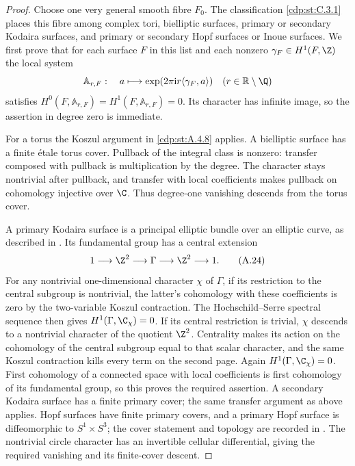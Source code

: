\begin{proof}
Choose one very general smooth fibre $F_0$. The classification \ref{cdp:st:C.3.1} places this fibre among complex tori, bielliptic surfaces, primary or secondary Kodaira surfaces, and primary or secondary Hopf surfaces or Inoue surfaces. We first prove that for each surface $F$ in this list and each nonzero $\gamma_F\in H^1(F,\Z)$ the local system
\[
 \mathbb A_{r,F}:\quad a\longmapsto
       \exp(2\pi\mathrm i r\langle\gamma_F,a\rangle)
 \quad(r\in\mathbb R\setminus\Q)
\]
satisfies $H^0(F,\mathbb A_{r,F})=H^1(F,\mathbb A_{r,F})=0$. Its character has infinite image, so the assertion in degree zero is immediate.

For a torus the Koszul argument in \ref{cdp:st:A.4.8} applies. A bielliptic surface has a finite étale torus cover. Pullback of the integral class is nonzero: transfer composed with pullback is multiplication by the degree. The character stays nontrivial after pullback, and transfer with local coefficients makes pullback on cohomology injective over $\C$. Thus degree-one vanishing descends from the torus cover.

A primary Kodaira surface is a principal elliptic bundle over an elliptic curve, as described in \cite[\S1 and the central-extension diagram in the proof of Lemma~1.1]{SS2002}. Its fundamental group has a central extension
\[
 1\longrightarrow\Z^2\longrightarrow\Gamma\longrightarrow\Z^2
       \longrightarrow1.
 \tag{A.24}\label{cdp:eq:A.24}
\]
For any nontrivial one-dimensional character $\chi$ of $\Gamma$, if its restriction to the central subgroup is nontrivial, the latter's cohomology with these coefficients is zero by the two-variable Koszul contraction. The Hochschild--Serre spectral sequence then gives $H^1(\Gamma,\C_\chi)=0$. If its central restriction is trivial, $\chi$ descends to a nontrivial character of the quotient $\Z^2$. Centrality makes its action on the cohomology of the central subgroup equal to that scalar character, and the same Koszul contraction kills every term on the second page. Again $H^1(\Gamma,\C_\chi)=0$. First cohomology of a connected space with local coefficients is first cohomology of its fundamental group, so this proves the required assertion. A secondary Kodaira surface has a finite primary cover; the same transfer argument as above applies. Hopf surfaces have finite primary covers, and a primary Hopf surface is diffeomorphic to $S^1\times S^3$; the cover statement and topology are recorded in \cite[\S2.1.1 and Theorem~2.2]{Albanese2020}. The nontrivial circle character has an invertible cellular differential, giving the required vanishing and its finite-cover descent.


\end{proof}

